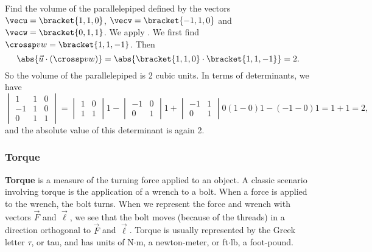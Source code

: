 \begin{example}\label{ex_crossp6}
Find the volume of the parallelepiped defined by the vectors $\vecu = \bracket{1,1,0}$, $\vecv = \bracket{-1,1,0}$ and $\vecw = \bracket{0,1,1}$.
\solution
We apply . We first find $\crossp vw =\bracket{1,1,-1}$. Then
\[\abs{\vec u\cdot(\crossp vw)} = \abs{\bracket{1,1,0}\cdot \bracket{1,1,-1}} = 2.\]
So the volume of the parallelepiped is 2 cubic units.  In terms of determinants, we have
\[
 \begin{vmatrix}1&1&0\\ -1&1&0\\0&1&1\end{vmatrix}
 =\begin{vmatrix}1&0\\1&1\end{vmatrix}1
 -\begin{vmatrix}-1&0\\0&1\end{vmatrix}1
 +\begin{vmatrix}-1&1\\0&1\end{vmatrix}0
 (1-0)1-(-1-0)1
 =1+1
 =2,
\]
and the absolute value of this determinant is again 2.
\end{example}


\subsubsection{Torque}

\textbf{Torque} is a measure of the turning force applied to an object. A classic scenario involving torque is the application of a wrench to a bolt. When a force is applied to the wrench, the bolt turns. When we represent the force and wrench with vectors $\vec F$ and $\vec \ell$, we see that the bolt moves (because of the threads) in a  direction orthogonal to $\vec F$ and $\vec \ell$. Torque is usually represented by the Greek letter $\tau$, or tau, and has units of N$\cdot$m, a newton-meter, or ft$\cdot$lb, a foot-pound.

